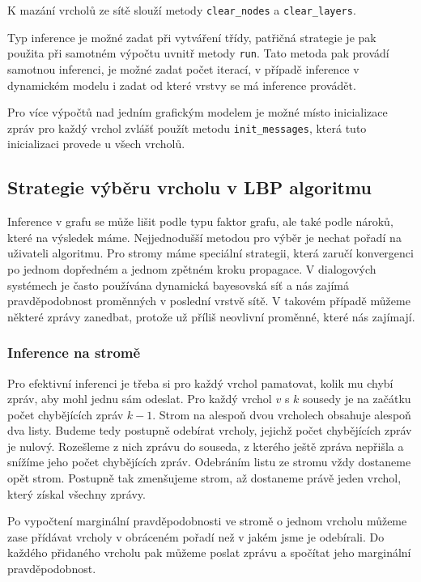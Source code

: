 K mazání vrcholů ze sítě slouží metody \texttt{clear\_nodes} a \texttt{clear\_layers}.

Typ inference je možné zadat při vytváření třídy, patřičná strategie je pak použita při samotném výpočtu uvnitř metody \texttt{run}. 
Tato metoda pak provádí samotnou inferenci, je možné zadat počet iterací, v případě inference v dynamickém modelu i zadat od které vrstvy se má inference provádět.

Pro více výpočtů nad jedním grafickým modelem je možné místo inicializace zpráv pro každý vrchol zvlášť použít metodu \texttt{init\_messages}, která tuto inicializaci provede u všech vrcholů.

\subsection{Strategie výběru vrcholu v LBP algoritmu}
\label{sec:noch}

Inference v grafu se může lišit podle typu faktor grafu, ale také podle nároků, které na výsledek máme.
Nejjednodušší metodou pro výběr je nechat pořadí na uživateli algoritmu.
Pro stromy máme speciální strategii, která zaručí konvergenci po jednom dopředném a jednom zpětném kroku propagace.
V dialogových systémech je často používána dynamická bayesovská síť a nás zajímá pravděpodobnost proměnných v poslední vrstvě sítě.
V takovém případě můžeme některé zprávy zanedbat, protože už příliš neovlivní proměnné, které nás zajímají.

\subsubsection{Inference na stromě}

Pro efektivní inferenci je třeba si pro každý vrchol pamatovat, kolik mu chybí zpráv, aby mohl jednu sám odeslat.
Pro každý vrchol $v$ s $k$ sousedy je na začátku počet chybějících zpráv $k-1$.
Strom na alespoň dvou vrcholech obsahuje alespoň dva listy.
Budeme tedy postupně odebírat vrcholy, jejichž počet chybějících zpráv je nulový.
Rozešleme z nich zprávu do souseda, z kterého ještě zpráva nepřišla a snížíme jeho počet chybějících zpráv.
Odebráním listu ze stromu vždy dostaneme opět strom.
Postupně tak zmenšujeme strom, až dostaneme právě jeden vrchol, který získal všechny zprávy.

Po vypočtení marginální pravděpodobnosti ve stromě o jednom vrcholu můžeme zase přídávat vrcholy v obráceném pořadí než v jakém jsme je odebírali.
Do každého přidaného vrcholu pak můžeme poslat zprávu a spočítat jeho marginální pravděpodobnost.


